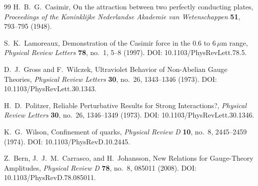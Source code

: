 \begin{thebibliography}{99}
H.~B.~G.~Casimir, On the attraction between two perfectly conducting plates, \textit{Proceedings of the Koninklijke Nederlandse Akademie van Wetenschappen} \textbf{51}, 793--795 (1948).

S.~K.~Lamoreaux, Demonstration of the Casimir force in the 0.6 to $6\,\mu\text{m}$ range, \textit{Physical Review Letters} \textbf{78}, no.~1, 5--8 (1997). DOI: 10.1103/PhysRevLett.78.5.

D.~J.~Gross and F.~Wilczek, Ultraviolet Behavior of Non-Abelian Gauge Theories, \textit{Physical Review Letters} \textbf{30}, no.~26, 1343--1346 (1973). DOI: 10.1103/PhysRevLett.30.1343.

H.~D.~Politzer, Reliable Perturbative Results for Strong Interactions?, \textit{Physical Review Letters} \textbf{30}, no.~26, 1346--1349 (1973). DOI: 10.1103/PhysRevLett.30.1346.

K.~G.~Wilson, Confinement of quarks, \textit{Physical Review D} \textbf{10}, no.~8, 2445--2459 (1974). DOI: 10.1103/PhysRevD.10.2445.

Z.~Bern, J.~J.~M.~Carrasco, and H.~Johansson, New Relations for Gauge-Theory Amplitudes, \textit{Physical Review D} \textbf{78}, no.~8, 085011 (2008). DOI: 10.1103/PhysRevD.78.085011.

\end{thebibliography}


